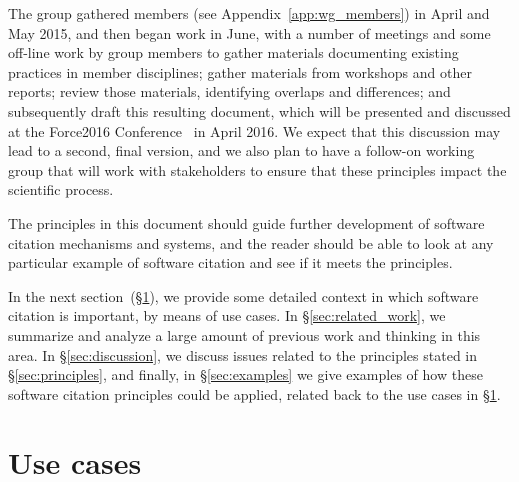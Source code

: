 \documentclass[11pt, oneside]{amsart}
\begin{document}
The group gathered members (see Appendix~\ref{app:wg_members}) in April and May 2015,
and then began work in June, with a number of meetings
and some off-line work by group members to gather materials documenting existing
practices in member disciplines; gather materials from workshops and other reports;
review those materials, identifying overlaps and differences; and subsequently draft this resulting document,
which will be presented and discussed at the Force2016 Conference~\cite{force2016}
in April 2016.  We expect that this discussion may lead to a second, final version, and we also
plan to have a follow-on working group that will work with stakeholders to ensure that
these principles impact the scientific process.

The principles in this document should guide further development of software citation
mechanisms and systems, and the reader should be able to look at any particular example
of software citation and see if it meets the principles.

In the next section~(\S\ref{sec:use_cases}), we provide some detailed context in
which software citation is important, by means of use cases. In
\S\ref{sec:related_work}, we summarize and analyze a large amount of previous
work and thinking in this area. In \S\ref{sec:discussion}, we discuss issues
related to the principles stated in \S\ref{sec:principles}, and finally, in
\S\ref{sec:examples} we give examples of how these software citation principles
could be applied, related back to the use cases in \S\ref{sec:use_cases}.


\section{Use cases}
\label{sec:use_cases}
\end{document}
